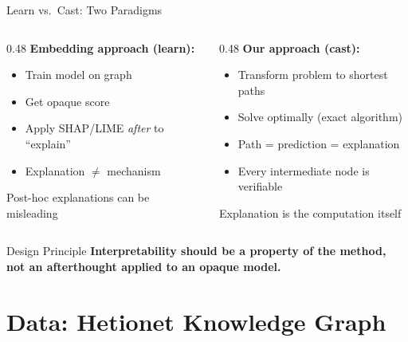 \documentclass[aspectratio=169,11pt]{beamer}
\begin{document}

\begin{frame}{Learn vs.\ Cast: Two Paradigms}

\begin{columns}[T]
\begin{column}{0.48\textwidth}
\textbf{Embedding approach (learn):}
\begin{itemize}
    \item Train model on graph
    \item Get opaque score
    \item Apply SHAP/LIME \emph{after} to ``explain''
    \item Explanation $\neq$ mechanism
\end{itemize}

\vspace{0.5em}
\textcolor{pillred}{Post-hoc explanations can be misleading}
\end{column}

\begin{column}{0.48\textwidth}
\textbf{Our approach (cast):}
\begin{itemize}
    \item Transform problem to shortest paths
    \item Solve optimally (exact algorithm)
    \item Path = prediction = explanation
    \item Every intermediate node is verifiable
\end{itemize}

\vspace{0.5em}
\textcolor{pillgreen}{Explanation is the computation itself}
\end{column}
\end{columns}

\vspace{1.2em}

\begin{block}{Design Principle}
\centering
\textbf{Interpretability should be a property of the method,\\
not an afterthought applied to an opaque model.}
\end{block}

\end{frame}

\section{Data: Hetionet Knowledge Graph}
\end{document}
